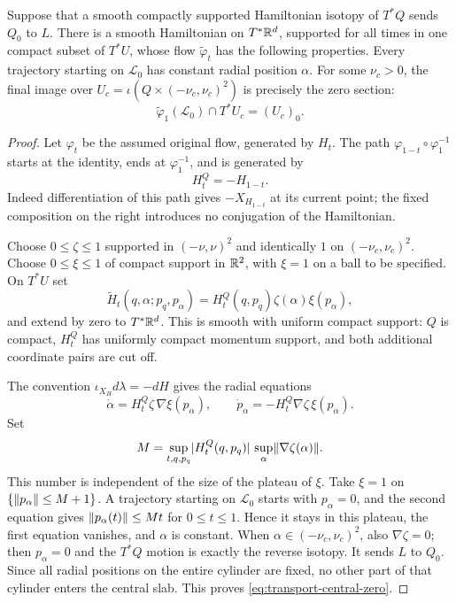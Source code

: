 \begin{lemma}
\label{lem:transport-cylinder-extension}
Suppose that a smooth compactly supported Hamiltonian isotopy of $T^*Q$
sends $Q_0$ to $L$.  There is a smooth Hamiltonian on $T^*\mathbb R^d$,
supported for all times in one compact subset of $T^*U$, whose flow
$\widetilde\varphi_t$ has the following properties.  Every trajectory
starting on $\mathcal L_0$ has constant radial position $\alpha$.
For some $\nu_c>0$, the final image over
$U_c=\iota(Q\times(-\nu_c,\nu_c)^2)$ is precisely the zero section:
\begin{equation}
 \widetilde\varphi_1(\mathcal L_0)\cap T^*U_c=(U_c)_0.
 \label{eq:transport-central-zero}
\end{equation}
\end{lemma}

\begin{proof}
Let $\varphi_t$ be the assumed original flow, generated by $H_t$.
The path $\varphi_{1-t}\circ\varphi_1^{-1}$ starts at the identity,
ends at $\varphi_1^{-1}$, and is generated by
\begin{equation}
 H_t^Q=-H_{1-t}.
 \label{eq:transport-reverse-sign}
\end{equation}
Indeed differentiation of this path gives $-X_{H_{1-t}}$ at its
current point; the fixed composition on the right introduces no
conjugation of the Hamiltonian.

Choose $0\le\zeta\le1$ supported in $(-\nu,\nu)^2$ and identically
$1$ on $(-\nu_c,\nu_c)^2$.  Choose $0\le\xi\le1$ of compact support
in $\mathbb R^2$, with $\xi=1$ on a ball to be specified.  On $T^*U$ set
\begin{equation}
 \widetilde H_t(q,\alpha;p_q,p_\alpha)
   =H_t^Q(q,p_q)\zeta(\alpha)\xi(p_\alpha),
 \label{eq:transport-extended-hamiltonian}
\end{equation}
and extend by zero to $T^*\mathbb R^d$.  This is smooth with uniform compact
support: $Q$ is compact, $H_t^Q$ has uniformly compact momentum
support, and both additional coordinate pairs are cut off.

The convention $\iota_{X_H}d\lambda=-dH$ gives the radial equations
\begin{equation}
 \dot\alpha=H_t^Q\zeta\,\nabla\xi(p_\alpha),
 \qquad
 \dot p_\alpha=-H_t^Q\nabla\zeta\,\xi(p_\alpha).
 \label{eq:transport-radial-equations}
\end{equation}
Set
\[
 M=\sup_{t,q,p_q}\lvert H_t^Q(q,p_q)\rvert\,\sup_\alpha\lVert\nabla\zeta(\alpha)\rVert.
\]
This number is independent of the size of the plateau of $\xi$.
Take $\xi=1$ on $\{\lVert p_\alpha\rVert\le M+1\}$.  A trajectory starting on
$\mathcal L_0$ starts with $p_\alpha=0$, and the second equation gives
$\lVert p_\alpha(t)\rVert\le Mt$ for $0\le t\le1$.  Hence it stays in this
plateau, the first equation vanishes, and $\alpha$ is constant.
When $\alpha\in(-\nu_c,\nu_c)^2$, also $\nabla\zeta=0$; then
$p_\alpha=0$ and the $T^*Q$ motion is exactly the reverse isotopy.
It sends $L$ to $Q_0$.  Since all radial positions on the entire
cylinder are fixed, no other part of that cylinder enters the central
slab.  This proves \eqref{eq:transport-central-zero}.
\end{proof}

